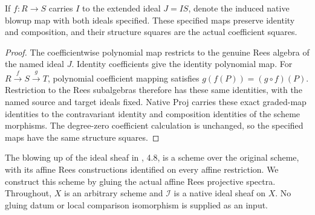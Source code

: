 \endgroup

\begingroup

\begin{lemma}
\label{lem:affine-blowup-coefficient-functorial}
\leanok
If $f:R\to S$ carries $I$ to the extended ideal $J=IS$, denote the
induced native blowup map with both ideals specified. These specified
maps preserve identity and composition, and their structure squares
are the actual coefficient squares.
\end{lemma}
\begin{proof}
The coefficientwise polynomial map restricts to the genuine Rees algebra
of the named ideal $J$. Identity coefficients give the identity polynomial
map. For $R\xrightarrow{f}S\xrightarrow{g}T$, polynomial coefficient
mapping satisfies $g(f(P))=(g\circ f)(P)$. Restriction to the Rees
subalgebras therefore has these same identities, with the named source
and target ideals fixed. Native Proj carries these exact graded-map
identities to the contravariant identity and composition identities
of the scheme morphisms. The degree-zero coefficient calculation is
unchanged, so the specified maps have the same structure squares.
\end{proof}

\endgroup

\begingroup

The blowing up of the ideal sheaf in \cite{deJong1996}, 4.8, is a
scheme over the original scheme, with its affine Rees constructions
identified on every affine restriction. We construct this scheme by
gluing the actual affine Rees projective spectra. Throughout, $X$ is
an arbitrary scheme and $\mathcal I$ is a native ideal sheaf on $X$.
No gluing datum or local comparison isomorphism is supplied as an input.

